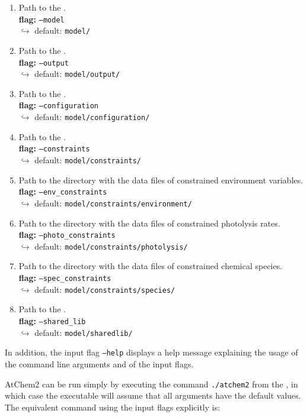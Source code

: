\begin{enumerate}
\item Path to the \modeldir.\\
  \textbf{flag:} \texttt{--model}\\
  $\hookrightarrow$ default: \texttt{model/}
\item Path to the \outdir.\\
 \textbf{flag:} \texttt{--output}\\
 $\hookrightarrow$ default: \texttt{model/output/}
\item Path to the \configdir.\\
  \textbf{flag:} \texttt{--configuration}\\
  $\hookrightarrow$ default: \texttt{model/configuration/}
\item Path to the \constrdir.\\
  \textbf{flag:} \texttt{--constraints}\\
  $\hookrightarrow$ default: \texttt{model/constraints/}
\item Path to the directory with the data files of constrained environment variables.\\
  \textbf{flag:} \texttt{--env\_constraints}\\
  $\hookrightarrow$ default: \texttt{model/constraints/environment/}
\item Path to the directory with the data files of constrained photolysis rates.\\
  \textbf{flag:} \texttt{--photo\_constraints}\\
  $\hookrightarrow$ default: \texttt{model/constraints/photolysis/}
\item Path to the directory with the data files of constrained chemical species.\\
  \textbf{flag:} \texttt{--spec\_constraints}\\
  $\hookrightarrow$ default: \texttt{model/constraints/species/}
\item Path to the \sharedir.\\
  \textbf{flag:} \texttt{--shared\_lib}\\
  $\hookrightarrow$ default: \texttt{model/sharedlib/}
\end{enumerate}

In addition, the input flag \texttt{--help} displays a help message explaining the usage of
the command line arguments and of the input flags.

AtChem2 can be run simply by executing the command \verb|./atchem2| from the \maindir, in which
case the executable will assume that all arguments have the default values. The equivalent
command using the input flags explicitly is:

